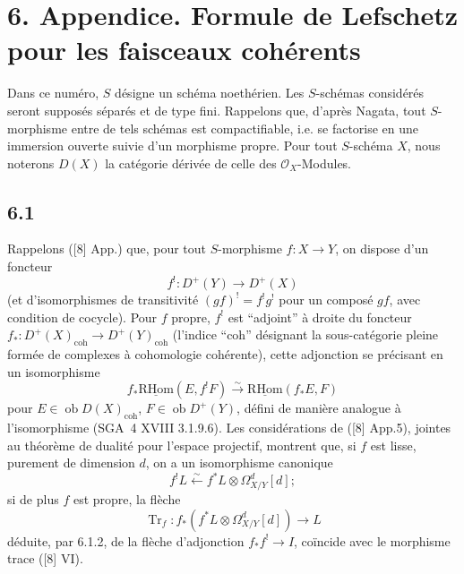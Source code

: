 \documentclass[11pt]{article}
\providecommand{\cO}{\mathcal{O}}
\providecommand{\RHom}{\mathrm{RHom}}
\providecommand{\uRHom}{\underline{\RHom}}
\providecommand{\RHom}{\mathrm{RHom}}
\providecommand{\RHom}{\mathrm R\mathcal{H}om}
\providecommand{\RHom}{\mathrm{RHom}}
\begin{document}
\section*{6. Appendice. Formule de Lefschetz pour les faisceaux cohérents}

Dans ce numéro, $S$ désigne un schéma noethérien. Les $S$-schémas considérés seront supposés séparés et de type fini. Rappelons que, d'après Nagata, tout $S$-morphisme entre de tels schémas est compactifiable, i.e. se factorise en une immersion ouverte suivie d'un morphisme propre. Pour tout $S$-schéma $X$, nous noterons $D(X)$ la catégorie dérivée de celle des $\cO_X$-Modules.

\subsection*{6.1}
Rappelons ([8] App.) que, pour tout $S$-morphisme $f:X\to Y$, on dispose d'un foncteur
\[
f^!:D^+(Y)\longrightarrow D^+(X)
\]
(et d'isomorphismes de transitivité $(gf)^! = f^!g^!$ pour un composé $gf$, avec condition de cocycle). Pour $f$ propre, $f^!$ est ``adjoint'' à droite du foncteur $f_*:D^+(X)_{\mathrm{coh}}\to D^+(Y)_{\mathrm{coh}}$ (l'indice ``coh'' désignant la sous-catégorie pleine formée de complexes à cohomologie cohérente), cette adjonction se précisant en un isomorphisme
\begin{equation}
\tag{6.1.1}
f_*\uRHom(E,f^!F)\xrightarrow{\sim}\uRHom(f_*E,F)
\end{equation}
pour $E\in\operatorname{ob}D(X)_{\mathrm{coh}}$, $F\in\operatorname{ob}D^+(Y)$, défini de manière analogue à l'isomorphisme (SGA~4 XVIII 3.1.9.6). Les considérations de ([8] App.5), jointes au théorème de dualité pour l'espace projectif, montrent que, si $f$ est lisse, purement de dimension $d$, on a un isomorphisme canonique
\begin{equation}
\tag{6.1.2}
f^!L\xleftarrow{\sim} f^*L\otimes\Omega^d_{X/Y}[d];
\end{equation}
si de plus $f$ est propre, la flèche
\begin{equation}
\tag{6.1.3}
\operatorname{Tr}_f:f_*(f^*L\otimes\Omega^d_{X/Y}[d])\longrightarrow L
\end{equation}
déduite, par 6.1.2, de la flèche d'adjonction $f_*f^!\to I$, coïncide avec le morphisme trace ([8] VI).
\end{document}
